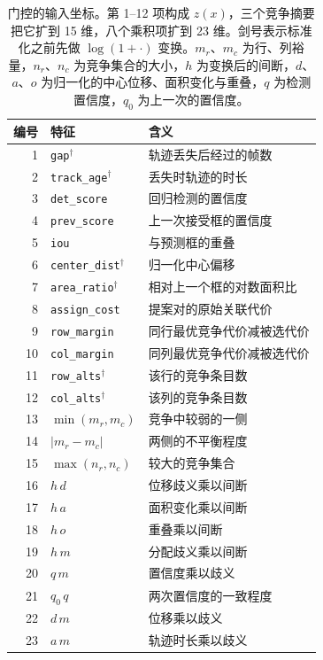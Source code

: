 \begin{table}[t]
\centering
\footnotesize
\setlength{\tabcolsep}{4pt}
\caption{门控的输入坐标。第 1--12 项构成 $z(x)$，三个竞争摘要把它扩到 15 维，八个乘积项扩到 23 维。剑号表示标准化之前先做 $\log(1+\cdot)$ 变换。$m_r$、$m_c$ 为行、列裕量，$n_r$、$n_c$ 为竞争集合的大小，$h$ 为变换后的间断，$d$、$a$、$o$ 为归一化的中心位移、面积变化与重叠，$q$ 为检测置信度，$q_0$ 为上一次的置信度。}
\label{tab:features-zh}
\begin{tabular}{rll}
\hline
编号 & 特征 & 含义 \\
\hline
1 & \texttt{gap}$^\dagger$ & 轨迹丢失后经过的帧数 \\
2 & \texttt{track\_age}$^\dagger$ & 丢失时轨迹的时长 \\
3 & \texttt{det\_score} & 回归检测的置信度 \\
4 & \texttt{prev\_score} & 上一次接受框的置信度 \\
5 & \texttt{iou} & 与预测框的重叠 \\
6 & \texttt{center\_dist}$^\dagger$ & 归一化中心偏移 \\
7 & \texttt{area\_ratio}$^\dagger$ & 相对上一个框的对数面积比 \\
8 & \texttt{assign\_cost} & 提案对的原始关联代价 \\
9 & \texttt{row\_margin} & 同行最优竞争代价减被选代价 \\
10 & \texttt{col\_margin} & 同列最优竞争代价减被选代价 \\
11 & \texttt{row\_alts}$^\dagger$ & 该行的竞争条目数 \\
12 & \texttt{col\_alts}$^\dagger$ & 该列的竞争条目数 \\
\hline
13 & $\min(m_r,m_c)$ & 竞争中较弱的一侧 \\
14 & $|m_r-m_c|$ & 两侧的不平衡程度 \\
15 & $\max(n_r,n_c)$ & 较大的竞争集合 \\
16 & $h\,d$ & 位移歧义乘以间断 \\
17 & $h\,a$ & 面积变化乘以间断 \\
18 & $h\,o$ & 重叠乘以间断 \\
19 & $h\,m$ & 分配歧义乘以间断 \\
20 & $q\,m$ & 置信度乘以歧义 \\
21 & $q_0\,q$ & 两次置信度的一致程度 \\
22 & $d\,m$ & 位移乘以歧义 \\
23 & $a\,m$ & 轨迹时长乘以歧义 \\
\hline
\end{tabular}
\end{table}

